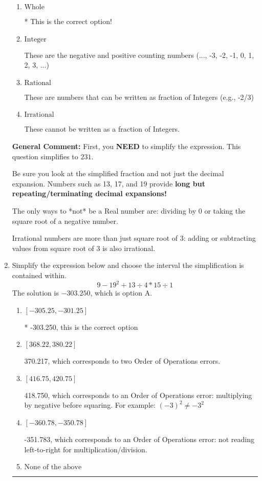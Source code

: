 \documentclass{extbook}[14pt]
\newcommand{\litem}[1]{\item #1

\rule{\textwidth}{0.4pt}}
\begin{document}
\begin{enumerate}
{\begin{enumerate}[label=\Alph*.]
These are Nonreal Complex numbers \textbf{OR} things that are not numbers (e.g., dividing by 0).
\item \( \text{Whole} \)

* This is the correct option!
\item \( \text{Integer} \)

These are the negative and positive counting numbers (..., -3, -2, -1, 0, 1, 2, 3, ...)
\item \( \text{Rational} \)

These are numbers that can be written as fraction of Integers (e.g., -2/3)
\item \( \text{Irrational} \)

These cannot be written as a fraction of Integers.
\end{enumerate}

\textbf{General Comment:} First, you \textbf{NEED} to simplify the expression. This question simplifies to $231$. 
 
 Be sure you look at the simplified fraction and not just the decimal expansion. Numbers such as 13, 17, and 19 provide \textbf{long but repeating/terminating decimal expansions!} 
 
 The only ways to *not* be a Real number are: dividing by 0 or taking the square root of a negative number. 
 
 Irrational numbers are more than just square root of 3: adding or subtracting values from square root of 3 is also irrational.
}
\litem{
Simplify the expression below and choose the interval the simplification is contained within.
\[ 9 - 19^2 + 13 \div 4 * 15 \div 1 \]The solution is \( -303.250 \), which is option A.\begin{enumerate}[label=\Alph*.]
\item \( [-305.25, -301.25] \)

* -303.250, this is the correct option
\item \( [368.22, 380.22] \)

 370.217, which corresponds to two Order of Operations errors.
\item \( [416.75, 420.75] \)

 418.750, which corresponds to an Order of Operations error: multiplying by negative before squaring. For example: $(-3)^2 \neq -3^2$
\item \( [-360.78, -350.78] \)

 -351.783, which corresponds to an Order of Operations error: not reading left-to-right for multiplication/division.
\item \( \text{None of the above} \)


\end{enumerate}}
\end{enumerate}
\end{document}
